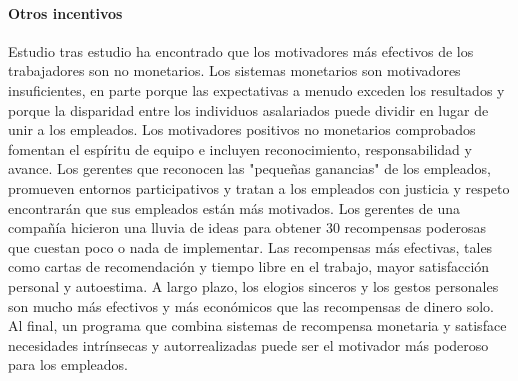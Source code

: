 \documentclass[10pt]{book}
\begin{document}
\paragraph{Otros incentivos} Estudio tras estudio ha encontrado que los motivadores más efectivos de los trabajadores son no monetarios. Los sistemas monetarios son motivadores insuficientes, en parte porque las expectativas a menudo exceden los resultados y porque la disparidad entre los individuos asalariados puede dividir en lugar de unir a los empleados. Los motivadores positivos no monetarios comprobados fomentan el espíritu de equipo e incluyen reconocimiento, responsabilidad y avance. Los gerentes que reconocen las "pequeñas ganancias" de los empleados, promueven entornos participativos y tratan a los empleados con justicia y respeto encontrarán que sus empleados están más motivados. Los gerentes de una compañía hicieron una lluvia de ideas para obtener 30 recompensas poderosas que cuestan poco o nada de implementar. Las recompensas más efectivas, tales como cartas de recomendación y tiempo libre en el trabajo, mayor satisfacción personal y autoestima. A largo plazo, los elogios sinceros y los gestos personales son mucho más efectivos y más económicos que las recompensas de dinero solo. Al final, un programa que combina sistemas de recompensa monetaria y satisface necesidades intrínsecas y autorrealizadas puede ser el motivador más poderoso para los empleados.
\end{document}

